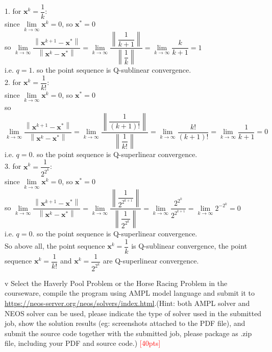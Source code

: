     1. for $\mathbf{x}^k = \dfrac{1}{k}$:\\
    since $\lim\limits_{k\to\infty}\mathbf{x}^k = 0$, so $\mathbf{x}^*=0$\\
    so $\lim\limits_{k\to\infty}\dfrac{\left\|\mathbf{x}^{k+1}-\mathbf{x}^*\right\|}{\left\|\mathbf{x}^k-\mathbf{x}^*\right\|}=\lim\limits_{k\to\infty}\dfrac{\left\|\dfrac{1}{k+1}\right\|}{\left\|\dfrac{1}{k}\right\|}=\lim\limits_{k\to\infty}\dfrac{k}{k+1}=1$\\
    i.e. $q=1$.
    so the point sequence is Q-sublinear convergence.\\

    2. for $\mathbf{x}^k = \dfrac{1}{k!}$:\\
    since $\lim\limits_{k\to\infty}\mathbf{x}^k = 0$, so $\mathbf{x}^*=0$\\
    so $\lim\limits_{k\to\infty}\dfrac{\left\|\mathbf{x}^{k+1}-\mathbf{x}^*\right\|}{\left\|\mathbf{x}^k-\mathbf{x}^*\right\|}=\lim\limits_{k\to\infty}\dfrac{\left\|\dfrac{1}{(k+1)!}\right\|}{\left\|\dfrac{1}{k!}\right\|}=\lim\limits_{k\to\infty}\dfrac{k!}{(k+1)!}=\lim\limits_{k\to\infty}\dfrac{1}{k+1}=0$\\
    i.e. $q=0$. 
    so the point sequence is Q-superlinear convergence.\\

    3. for $\mathbf{x}^k = \dfrac{1}{2^{2^k}}$:\\
    since $\lim\limits_{k\to\infty}\mathbf{x}^k = 0$, so $\mathbf{x}^*=0$\\
    so $\lim\limits_{k\to\infty}\dfrac{\left\|\mathbf{x}^{k+1}-\mathbf{x}^*\right\|}{\left\|\mathbf{x}^k-\mathbf{x}^*\right\|}=\lim\limits_{k\to\infty}\dfrac{\left\|\dfrac{1}{2^{2^{k+1}}}\right\|}{\left\|\dfrac{1}{2^{2^k}}\right\|}=\lim\limits_{k\to\infty}\dfrac{2^{2^k}}{2^{2^{k+1}}}=\lim\limits_{k\to\infty}{2^{-2^k}}=0$\\
    i.e. $q=0$.
    so the point sequence is Q-superlinear convergence.\\

    So above all, the point sequence $\mathbf{x}^k = \dfrac{1}{k}$ is Q-sublinear convergence, the point sequence $\mathbf{x}^k = \dfrac{1}{k!}$ and $\mathbf{x}^k = \dfrac{1}{2^{2^k}}$ are Q-superlinear convergence.\\


\newpage
\begin{problem}{v}
Select the Haverly Pool Problem or the Horse Racing Problem in the courseware, compile the program using AMPL model language and submit it to \url{https://neos-server.org/neos/solvers/index.html}.(Hint: both AMPL solver and NEOS solver can be used, please indicate the type of solver used in the submitted job, show the solution results (eg: screenshots attached to the PDF file), and submit the source code together with the submitted job, please package as .zip file, including your PDF and source code.)
\textcolor{red}{[40pts]}
\end{problem}
    
